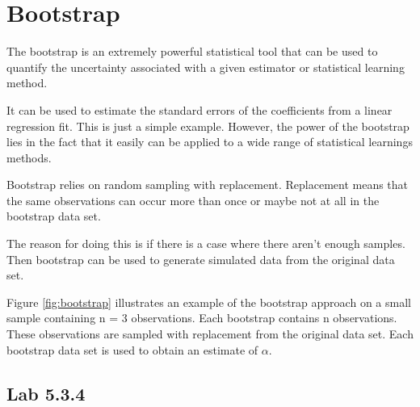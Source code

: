 \chapter{Bootstrap}
\label{chp:boots}

The bootstrap is an extremely powerful statistical tool that can be used to quantify the uncertainty associated with a given estimator or statistical learning method.

It can be used to estimate the standard errors of the coefficients from a linear regression fit. This is just a simple example. However, the power of the bootstrap lies in the fact that it easily can be applied to a wide range of statistical learnings methods.

Bootstrap relies on random sampling with replacement. Replacement means that the same observations can occur more than once or maybe not at all in the bootstrap data set.

The reason for doing this is if there is a case where there aren't enough samples. Then bootstrap can be used to generate simulated data from the original data set.
 


Figure \ref{fig:bootstrap} illustrates an example of the bootstrap approach on a small sample containing n = 3 observations. Each bootstrap contains n observations. These observations are sampled with replacement from the original data set. Each bootstrap data set is used to obtain an estimate of $\alpha$.
\section{Lab 5.3.4}